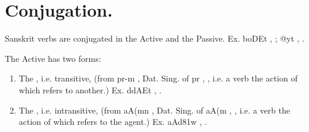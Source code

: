 \def\DevnagVersion{2.17}%
\chapter{Conjugation.}

\s Sanskrit verbs are conjugated in the Active and the Passive. Ex.
{\dn boDEt} , ; {\dn {}@yt\?} ,
.

\s The Active has two forms:

\begin{enumerate}
\item The , i.e. transitive, (from {\dn pr-m\4}
  , Dat. Sing. of {\dn pr} , , i.e. a
  verb the action of which refers to another.) Ex. {\dn ddAEt}
  , .
\item The , i.e. intransitive, (from {\dn aA(mn\?}
  , Dat. Sing. of {\dn aA(m} , , i.e. a
  verb the action of which refers to the agent.) Ex. {\dn aAd\381w\?}
  , .
\end{enumerate}

